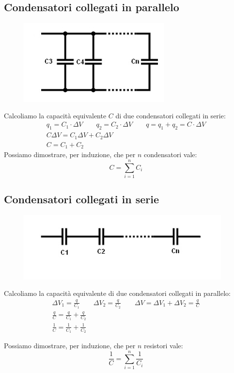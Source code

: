 \subsection{Condensatori collegati in parallelo}
\begin{figure}
	\centering
    \includegraphics[scale = 0.7]{Pictures/condensatori-parallelo}
\end{figure}
Calcoliamo la capacità equivalente $C$ di due condensatori collegati in serie:
\begin{displaymath}\begin{aligned}
	q_1 = C_1 \cdot \Delta V \qquad q_2 = C_2 \cdot \Delta V \qquad q = q_1 + q_2 = C \cdot \Delta V\\
    C \Delta V = C_1 \Delta V + C_2 \Delta V\\
    C = C_1 + C_2
\end{aligned}\end{displaymath}
Possiamo dimostrare, per induzione, che per $n$ condensatori vale:
\begin{displaymath}
	C = \sum_{i=1}^n C_i
\end{displaymath}

\subsection{Condensatori collegati in serie}
\begin{figure}[h!]
	\centering
    \includegraphics[scale = 0.8]{Pictures/condensatori-serie}
\end{figure}
Calcoliamo la capacità equivalente di due condensatori collegati in parallelo:
\begin{displaymath}\begin{aligned}
	\Delta V_1 = \frac{q}{C_1} \qquad \Delta V_2 = \frac{q}{C_2} \qquad
    \Delta V = \Delta V_1 + \Delta V_2 = \frac{q}{C}\\
    \frac{q}{C} = \frac{q}{C_1} + \frac{q}{C_2}\\
    \frac{1}{C} = \frac{1}{C_1} + \frac{1}{C_2}
\end{aligned}\end{displaymath}

Possiamo dimostrare, per induzione, che per $n$ resistori vale:
\begin{displaymath}
	\frac{1}{C} = \sum_{i=1}^n \frac{1}{C_i}
\end{displaymath}